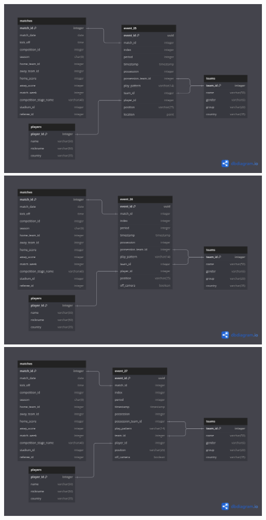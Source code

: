 \documentclass[12pt]{article}
\begin{document}
\includegraphics[width=\textwidth]{schema-diagram/event_25.png}
\includegraphics[width=\textwidth]{schema-diagram/event_26.png}
\includegraphics[width=\textwidth]{schema-diagram/event_27.png}
\end{document}
